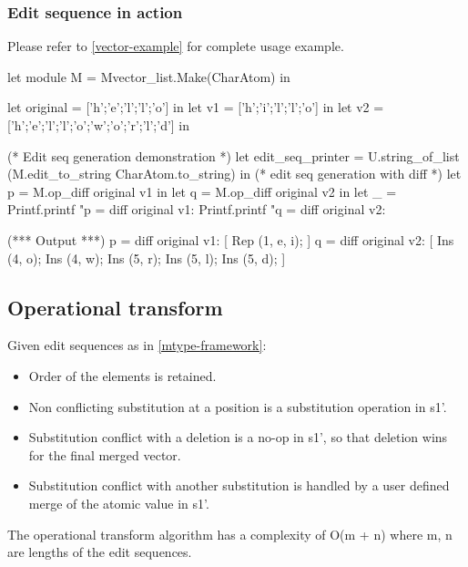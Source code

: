 \documentclass{article}
\begin{document}
\subsubsection{Edit sequence in action}
Please refer to \ref{vector-example} for complete usage example.

\begin{longlisting}
let module M = Mvector_list.Make(CharAtom) in

let original = ['h';'e';'l';'l';'o'] in
let v1 = ['h';'i';'l';'l';'o'] in
let v2 = ['h';'e';'l';'l';'o';'w';'o';'r';'l';'d'] in

(* Edit seq generation demonstration *)
let edit_seq_printer = U.string_of_list (M.edit_to_string CharAtom.to_string) in 
(* edit seq generation with diff *)
let p = M.op_diff original v1 in
let q = M.op_diff original v2 in
let _ = 
  Printf.printf "p = diff original v1: %
  Printf.printf "q = diff original v2: %

(*** Output ***)
p = diff original v1: [ Rep (1, e, i); ]
q = diff original v2: [ Ins (4, o); Ins (4, w); Ins (5, r); Ins (5, l); Ins (5, d); ]
\end{longlisting}

\subsection{Operational transform}
Given edit sequences as in \ref{mtype-framework}: 
\begin{itemize}
\item Order of the elements is retained. 
\item Non conflicting substitution at a position is a substitution operation in s1'.
\item Substitution conflict with a deletion is a no-op in s1', so that deletion wins for the final merged vector. 
\item Substitution conflict with another substitution is handled by a user defined merge of the atomic value in s1'. 
\end{itemize}
The operational transform algorithm has a complexity of O(m + n) where m, n are lengths of the edit sequences.
\end{document}
